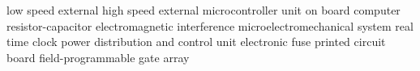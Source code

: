      {low speed external}
     {high speed external}
     {microcontroller unit}
     {on board computer}
      {resistor-capacitor}
     {electromagnetic interference}
    {microelectromechanical system}
     {real time clock}
    {power distribution and control unit}
   {electronic fuse}
     {printed circuit board}
    {field-programmable gate array}